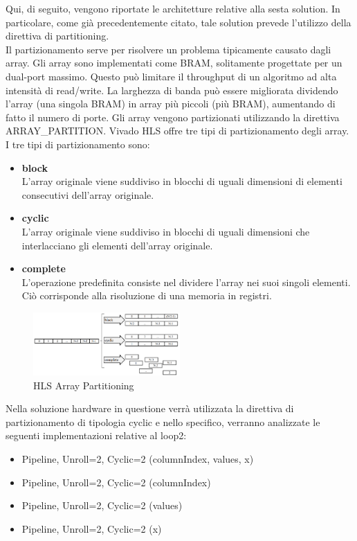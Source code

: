 Qui, di seguito, vengono riportate le architetture relative alla sesta solution. In particolare, come già precedentemente citato, tale solution prevede l'utilizzo della direttiva di partitioning. 
\\
Il partizionamento serve per risolvere un problema tipicamente causato dagli array. Gli array sono implementati come BRAM, solitamente progettate per un dual-port massimo. Questo può limitare il throughput di un algoritmo ad alta intensità di read/write. La larghezza di banda può essere migliorata dividendo l'array (una singola BRAM) in array più piccoli (più BRAM), aumentando di fatto il numero di porte. Gli array vengono partizionati utilizzando la direttiva ARRAY\_PARTITION. Vivado HLS offre tre tipi di partizionamento degli array. I tre tipi di partizionamento sono:
\begin{itemize}
	\item \textbf{block}\\L'array originale viene suddiviso in blocchi di uguali dimensioni di elementi consecutivi dell'array originale.
	\item \textbf{cyclic}\\L'array originale viene suddiviso in blocchi di uguali dimensioni che interlacciano gli elementi dell'array originale.
	\item \textbf{complete}\\L'operazione predefinita consiste nel dividere l'array nei suoi singoli elementi. Ciò corrisponde alla risoluzione di una memoria in registri.
\end{itemize}

\begin{figure}[H]
	\centering
	\includegraphics[width=0.5\textwidth]{solutions/s6/partitioning.png}
	\caption{HLS Array Partitioning}
\end{figure}

Nella soluzione hardware in questione verrà utilizzata la direttiva di partizionamento di tipologia cyclic e nello specifico, verranno analizzate le seguenti implementazioni relative al loop2:
\begin{itemize}
	\item Pipeline, Unroll=2, Cyclic=2 (columnIndex, values, x)
	\item Pipeline, Unroll=2, Cyclic=2 (columnIndex)
	\item Pipeline, Unroll=2, Cyclic=2 (values)
	\item Pipeline, Unroll=2, Cyclic=2 (x)
\end{itemize}

